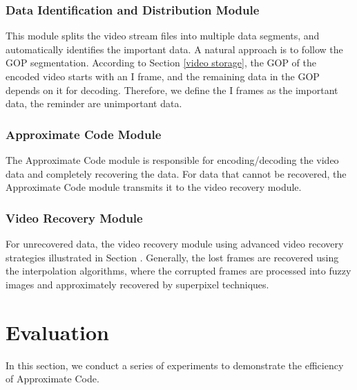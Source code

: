 \documentclass[sigconf]{acmart}
\begin{document}
\subsubsection{Data Identification and Distribution Module}
This module splits the video stream files into multiple data segments, and automatically identifies the important data. A natural approach is to follow the GOP segmentation. According to Section \ref{video storage}, the GOP of the encoded video starts with an I frame, and the remaining data in the GOP depends on it for decoding. Therefore, we define the I frames as the important data, the reminder are unimportant data.

\subsubsection{Approximate Code Module}
The Approximate Code module is responsible for encoding/decoding the video data and completely recovering the data. For data that cannot be recovered, the Approximate Code module transmits it to the video recovery module.

\subsubsection{Video Recovery Module}
For unrecovered data, the video recovery module using advanced video recovery strategies illustrated in Section \label{video storage}. Generally, the lost frames are recovered using the interpolation algorithms, where the corrupted frames are processed into fuzzy images and approximately recovered by superpixel techniques.


\section{Evaluation}\label{evaluation}
In this section, we conduct a series of experiments to demonstrate the efficiency of Approximate Code.
\end{document}
